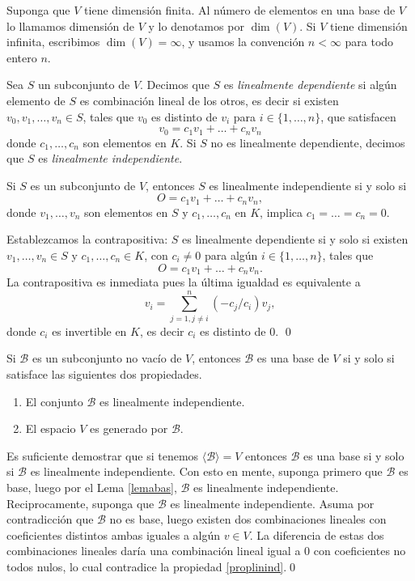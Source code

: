 \begin{defn}
Suponga que $V$ tiene dimensi\'on finita. Al n\'umero de elementos en una base de $V$ lo llamamos dimensi\'on de $V$ y lo denotamos por $\dim (V)$. Si $V$ tiene dimensi\'on infinita, escribimos $\dim(V)=\infty$, y usamos la convenci\'on $n<\infty$ para todo entero $n$.
\end{defn}

\begin{defn}
Sea $S$ un subconjunto de $V$. Decimos que $S$ es \emph{linealmente dependiente} si alg\'un elemento de $S$ es combinaci\'on lineal de los otros, es decir si existen $v_0,v_1,\ldots,v_n\in S$, tales que $v_0$ es distinto de $v_i$ para $i\in\{1,\ldots,n\}$, que satisfacen
\[
v_0=c_1v_1+\ldots+c_nv_n
\]
donde $c_1,\ldots,c_n$ son elementos en $K$. Si $S$ no es linealmente dependiente, decimos que $S$ es \emph{linealmente independiente}.
\end{defn}

\begin{prop}\label{proplinind}
Si $S$ es un subconjunto de $V$, entonces $S$ es linealmente independiente si y solo si
\[
O=c_1v_1+\ldots+c_nv_n,
\]
donde $v_1,\ldots,v_n$ son elementos en $S$ y $c_1,\ldots,c_n$ en $K$, implica $c_1=\ldots=c_n=0$. 
\end{prop}

\dem Establezcamos la contrapositiva: $S$ es linealmente dependiente si y solo si existen $v_1,\ldots,v_n\in S$ y $c_1,\ldots,c_n\in K$, con $c_i\ne 0$ para alg\'un $i\in\{1,\ldots, n\}$, tales que
\[
O=c_1v_1+\ldots+c_nv_n.
\]
La contrapositiva es inmediata pues la \'ultima igualdad es equivalente a
\[
v_i=\sum_{j=1,j\ne i}^n (-c_j/c_i)v_j,
\]
donde $c_i$ es invertible en $K$, es decir $c_i$ es distinto de $0$. \qed

\begin{prop}\label{defbase2}
Si $\mathcal{B}$ es un subconjunto no vac\'io de $V$, entonces $\mathcal{B}$ es una base de $V$ si y solo si satisface las siguientes dos propiedades.
\begin{enumerate}
\item El conjunto $\mathcal{B}$ es linealmente independiente.
\item El espacio $V$ es generado por $\mathcal{B}$.
\end{enumerate}
\end{prop}

\dem Es suficiente demostrar que si tenemos $\langle \mathcal{B}\rangle=V$ entonces $\mathcal{B}$ es una base si y solo si $\mathcal{B}$ es linealmente independiente. Con esto en mente, suponga primero que $\mathcal{B}$ es base, luego por el Lema \ref{lemabas}, $\mathcal{B}$ es linealmente independiente. Reciprocamente, suponga que $\mathcal{B}$ es linealmente independiente. Asuma por contradicci\'on que $\mathcal{B}$ no es base, luego existen dos combinaciones lineales con coeficientes distintos ambas iguales a alg\'un $v\in V$. La diferencia de estas dos combinaciones lineales dar\'ia una combinaci\'on lineal igual a $0$ con coeficientes no todos nulos, lo cual contradice la propiedad \ref{proplinind}.\qed

